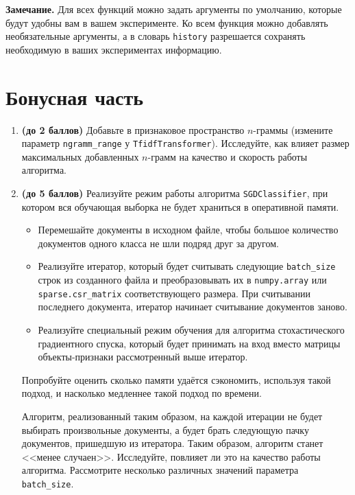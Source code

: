 \documentclass[10pt,fleqn]{article}
\begin{document}
\textbf{Замечание.} Для всех функций можно задать аргументы по умолчанию, которые будут удобны вам в вашем эксперименте.
Ко всем функция можно добавлять необязательные аргументы, а в словарь \texttt{history} разрешается сохранять необходимую в ваших экспериментах информацию.

\section*{Бонусная часть}

\begin{enumerate}
\item \textbf{(до 2 баллов)} Добавьте в признаковое пространство $n$-граммы (измените параметр \texttt{ngramm\_range} у \texttt{TfidfTransformer}). Исследуйте, как влияет размер максимальных добавленных $n$-грамм на качество и скорость работы алгоритма.

\item \textbf{(до 5 баллов)} Реализуйте режим работы алгоритма \texttt{SGDClassifier}, при котором вся обучающая выборка не будет храниться в оперативной памяти.

\begin{itemize}
    \item Перемешайте документы в исходном файле, чтобы большое количество документов одного класса не шли подряд друг за другом.
    \item Реализуйте итератор, который будет считывать следующие \texttt{batch\_size} строк из созданного файла и преобразовывать их в \texttt{numpy.array} или \texttt{sparse.csr\_matrix} соответствующего размера. При считывании последнего документа, итератор начинает считывание документов заново.
    \item Реализуйте специальный режим обучения для алгоритма стохастического градиентного спуска, который будет принимать на вход вместо матрицы объекты-признаки рассмотренный выше итератор.
\end{itemize}

Попробуйте оценить сколько памяти удаётся сэкономить, используя такой подход, и насколько медленнее такой подход по времени.

Алгоритм, реализованный таким образом, на каждой итерации не будет выбирать произвольные документы, а будет брать следующую пачку документов, пришедшую из итератора. Таким образом, алгоритм станет <<менее случаен>>. Исследуйте, повлияет ли это на качество работы алгоритма. Рассмотрите несколько различных значений параметра \texttt{batch\_size}.


\end{enumerate}
\end{document}
